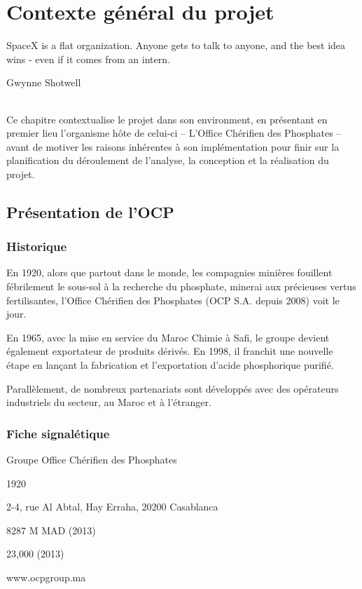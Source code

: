 \chapter{Contexte général du projet}
\epigraph{SpaceX is a flat organization. Anyone gets to talk to anyone, and the best idea wins - even if it comes from an intern.}{Gwynne Shotwell}	
\subparagraph{}
Ce chapitre contextualise le projet dans son environment, en présentant en premier lieu l'organisme hôte de celui-ci – L'Office Chérifien des Phosphates – avant de motiver les raisons inhérentes à son implémentation pour finir sur la planification du déroulement de l'analyse, la conception et la réalisation du projet.
\cleardoublepage

\section{Présentation de l’OCP}
	\subsection{Historique}
	En 1920, alors que partout dans le monde, les compagnies minières fouillent fébrilement le
sous-sol à la recherche du phosphate, minerai aux précieuses vertus fertilisantes, l’Office
Chérifien des Phosphates (OCP S.A. depuis 2008) voit le jour.

En 1965, avec la mise en service du Maroc Chimie à Safi, le groupe devient également
exportateur de produits dérivés. En 1998, il franchit une nouvelle étape en lançant la fabrication
et l’exportation d’acide phosphorique purifié.

Parallèlement, de nombreux partenariats sont développés avec des opérateurs industriels du
secteur, au Maroc et à l’étranger.
	\subsection{Fiche signalétique}
	\begin{description}[align=left]
		\item [Nomination sociale :] Groupe Office Chérifien des Phosphates
		\item [Date de création :] 1920
		\item [Siège social :] 2-4, rue Al Abtal, Hay Erraha, 20200 Casablanca
		\item [Capital social :] 8287 M MAD (2013)
		\item [Effectif employé :] 23,000 (2013)
		\item [Site web :] www.ocpgroup.ma
	\end{description}
